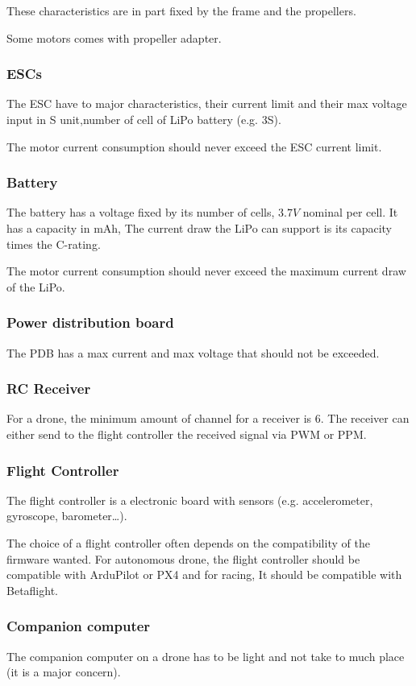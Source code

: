 These characteristics are in part fixed by the frame and the propellers.

Some motors comes with propeller adapter.

\subsubsection{ESCs}
The ESC have to major characteristics, their current limit and their max voltage input in S unit,number of cell of LiPo battery (e.g. 3S).

The motor current consumption should never exceed the ESC current limit.

\subsubsection{Battery}
The battery has a voltage fixed by its number of cells, $3.7V$ nominal per cell.
It has a capacity in mAh,
The current draw the LiPo can support is its capacity times the C-rating.

The motor current consumption should never exceed the maximum current draw of the LiPo.

\subsubsection{Power distribution board}
The PDB has a max current and max voltage that should not be exceeded.

\subsubsection{RC Receiver}
For a drone, the minimum amount of channel for a receiver is 6.
The receiver can either send to the flight controller the received signal via PWM or PPM.

\subsubsection{Flight Controller}
The flight controller is a electronic board with sensors (e.g. accelerometer, gyroscope, barometer…).

The choice of a flight controller often depends on the compatibility of the firmware wanted. For autonomous drone, the flight controller should be compatible with ArduPilot or PX4 and for racing, It should be compatible with Betaflight.

\subsubsection{Companion computer}
The companion computer on a drone has to be light and not take to much place (it is a major concern).

